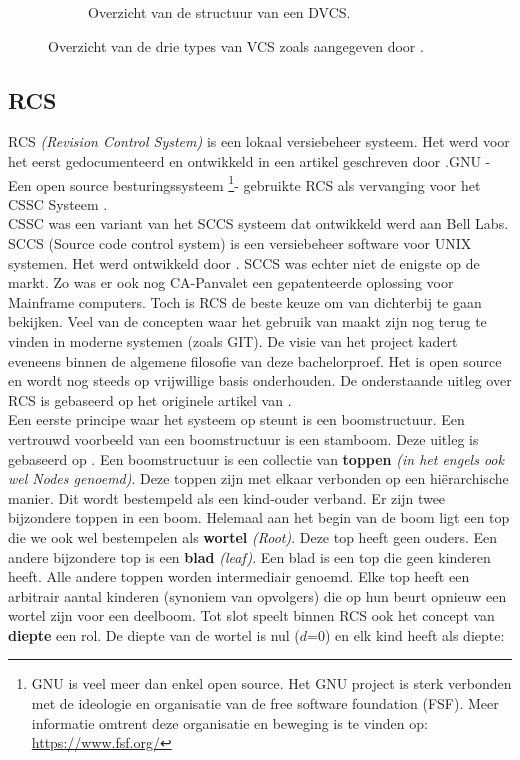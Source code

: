 \begin{figure}[h!]
\begin{subfigure}{.5\textwidth}
	\caption[Overzicht structuur DVCS]{Overzicht van de structuur van een DVCS.}
	\end{subfigure}
	
	\caption[Overzicht types VCS]{Overzicht van de drie types van VCS zoals aangegeven door \textcite{Chacon2014}.}
	\label{fig:TypesVCS}
\end{figure}

	
\subsection{RCS}
\label{sec:RCS}


RCS \textit{(Revision Control System)} is een lokaal versiebeheer systeem. Het werd voor het eerst gedocumenteerd en ontwikkeld in een artikel geschreven door \textcite{Tichy85rcs}.GNU - Een open source besturingssysteem \footnote{GNU is veel meer dan enkel open source. Het GNU project is sterk verbonden met de ideologie en organisatie van de free software foundation (FSF). Meer informatie omtrent deze organisatie en beweging is te vinden op: \url{https://www.fsf.org/}}- gebruikte RCS als vervanging voor het CSSC Systeem \autocite{GNUCSSC}.\\

CSSC was een variant van het SCCS systeem dat ontwikkeld werd aan Bell Labs. SCCS (Source code control system) is een versiebeheer software voor UNIX systemen. Het werd ontwikkeld door \textcite{Rochkind1975}. SCCS was echter niet de enigste op de markt. Zo was er ook nog CA-Panvalet een gepatenteerde oplossing voor Mainframe computers. Toch is RCS de beste keuze om van dichterbij te gaan bekijken. Veel van de concepten waar het gebruik van maakt zijn nog terug te vinden in moderne systemen (zoals GIT). De visie van het project kadert eveneens binnen de algemene filosofie van deze bachelorproef. Het is open source en wordt nog steeds op vrijwillige basis onderhouden. De onderstaande uitleg over RCS is gebaseerd op het originele artikel van \textcite{Tichy85rcs}.\\

Een eerste principe waar het systeem op steunt is een boomstructuur. Een vertrouwd voorbeeld van een boomstructuur is een stamboom. Deze uitleg is gebaseerd op \textcite{Lievens2019}. Een boomstructuur is een collectie van \textbf{toppen} \textit{(in het engels ook wel Nodes genoemd)}. Deze toppen zijn met elkaar verbonden op een hiërarchische manier. Dit wordt bestempeld als een kind-ouder verband. Er zijn twee bijzondere toppen in een boom. Helemaal aan het begin van de boom ligt een top die we ook wel bestempelen als \textbf{wortel} \textit{(Root)}. Deze top heeft geen ouders. Een andere bijzondere top is een \textbf{blad} \textit{(leaf)}. Een blad is een top die geen kinderen heeft. Alle andere toppen worden intermediair genoemd. Elke top heeft een arbitrair aantal kinderen (synoniem van opvolgers) die op hun beurt opnieuw een wortel zijn voor een deelboom. Tot slot speelt binnen RCS ook het concept van \textbf{diepte} een rol. De diepte van de wortel is nul ($d$=0) en elk kind heeft als diepte: 

